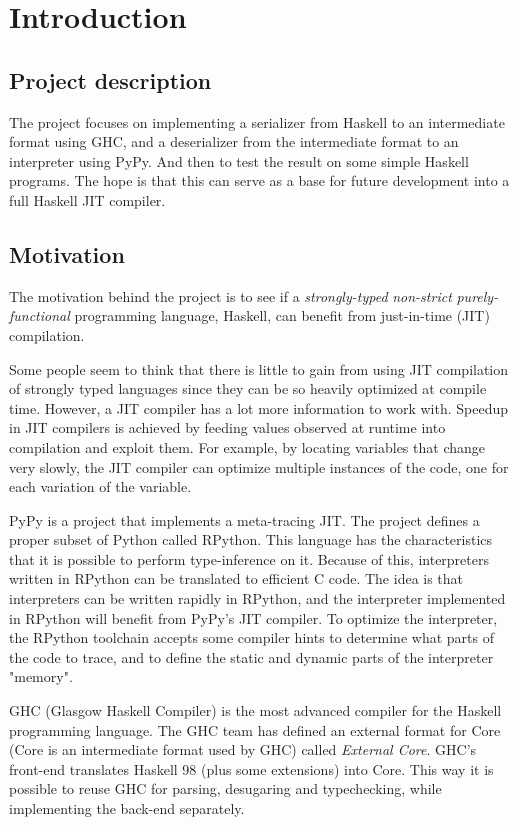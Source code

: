 
\section{Introduction}

\subsection{Project description}

The project focuses on implementing a serializer from Haskell to an intermediate
format using GHC, and a deserializer from the intermediate format to an
interpreter using PyPy. And then to test the result on some simple Haskell
programs. The hope is that this can serve as a base for future development
into a full Haskell JIT compiler.

\subsection{Motivation}

The motivation behind the project is to see if a \emph{strongly-typed} 
\emph{non-strict} \emph{purely-functional} programming language, Haskell, 
can benefit from just-in-time (JIT) compilation.

Some people seem to think that there is little to gain from using 
JIT compilation of strongly typed languages since they can be
so heavily optimized at compile time. However, a JIT compiler has a lot
more information to work with. Speedup in JIT compilers is achieved by
feeding values observed at runtime into compilation and exploit them.
For example, by locating variables that change very slowly, the JIT compiler can
optimize multiple instances of the code, one for each variation of the
variable. \cite{bolz2011runtime}

PyPy is a project that implements a meta-tracing JIT. The project
defines a proper subset of Python called RPython. This language has 
the characteristics that it is possible to perform type-inference on it.
Because of this, interpreters written in RPython can be translated to
efficient C code.
The idea is that interpreters can be written rapidly in RPython, and the
interpreter implemented in RPython will benefit from PyPy's JIT compiler.
To optimize the interpreter, the RPython toolchain accepts some compiler
hints to determine what parts of the code to trace, and to define the 
static and dynamic parts of the interpreter "memory". \cite{bolz2011runtime}

GHC (Glasgow Haskell Compiler) is the most advanced compiler for the
Haskell programming language. The GHC team has defined an external format
for Core (Core is an intermediate format used by GHC) called \emph{External Core}. 
GHC's front-end translates Haskell 98 (plus some extensions) into Core. 
This way it is possible to reuse GHC for parsing, desugaring and typechecking, 
while implementing the back-end separately. \cite{tolmach2010ghc}

